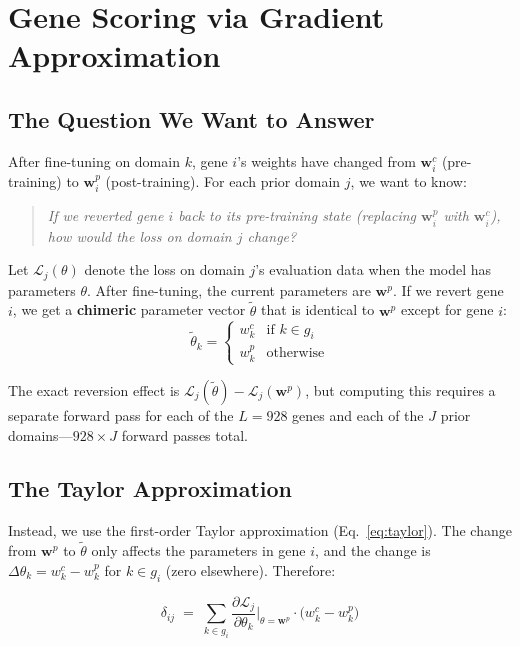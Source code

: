 \documentclass[11pt,letterpaper]{article}
\theoremstyle{definition}
\begin{document}
\section{Gene Scoring via Gradient Approximation}
\label{sec:scoring}

\subsection{The Question We Want to Answer}

After fine-tuning on domain $k$, gene $i$'s weights have changed from $\mathbf{w}^c_i$ (pre-training) to $\mathbf{w}^p_i$ (post-training). For each prior domain $j$, we want to know:

\begin{quote}
\emph{If we reverted gene $i$ back to its pre-training state (replacing $\mathbf{w}^p_i$ with $\mathbf{w}^c_i$), how would the loss on domain $j$ change?}
\end{quote}

Let $\mathcal{L}_j(\theta)$ denote the loss on domain $j$'s evaluation data when the model has parameters $\theta$. After fine-tuning, the current parameters are $\mathbf{w}^p$. If we revert gene $i$, we get a \textbf{chimeric} parameter vector $\tilde{\theta}$ that is identical to $\mathbf{w}^p$ except for gene $i$:
\[
\tilde{\theta}_k = \begin{cases} w^c_k & \text{if } k \in g_i \\ w^p_k & \text{otherwise} \end{cases}
\]

The exact reversion effect is $\mathcal{L}_j(\tilde{\theta}) - \mathcal{L}_j(\mathbf{w}^p)$, but computing this requires a separate forward pass for each of the $L = 928$ genes and each of the $J$ prior domains---$928 \times J$ forward passes total.

\subsection{The Taylor Approximation}

Instead, we use the first-order Taylor approximation (Eq.~\ref{eq:taylor}). The change from $\mathbf{w}^p$ to $\tilde{\theta}$ only affects the parameters in gene $i$, and the change is $\Delta\theta_k = w^c_k - w^p_k$ for $k \in g_i$ (zero elsewhere). Therefore:

\begin{equation}
\boxed{\delta_{ij} \;=\; \sum_{k \in g_i} \frac{\partial \mathcal{L}_j}{\partial \theta_k}\Bigg|_{\theta = \mathbf{w}^p} \cdot \bigl(w^c_k - w^p_k\bigr)}
\label{eq:genescore}
\end{equation}
\end{document}
